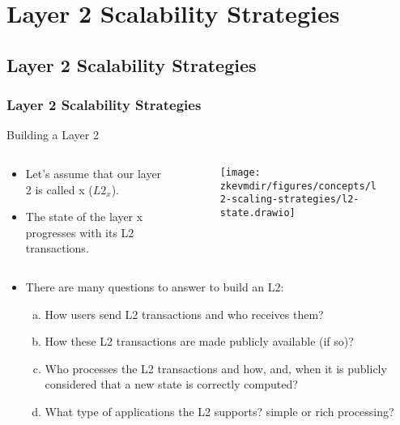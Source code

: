 

\renewcommand{\mytitle}{Layer 2 Scalability Strategies}
\ifZEROSEC \fi
\ifSEC \section{\mytitle{}}\fi
\ifSUBSEC \subsection{\mytitle{}}\fi
\ifSUBSUBSEC \subsubsection{\mytitle{}}\fi


\begin{frame}{Building a Layer 2}
\begin{columns}
\begin{column}{0.35\textwidth}
\begin{itemize}
\item Let's assume that our layer 2 is called x ($L2_x$).
\item The state of the layer x progresses with its L2 transactions.
\end{itemize}
\end{column}
\begin{column}{0.65\textwidth}
\begin{figure}
\texttt{[image: \\zkevmdir/figures/concepts/l2-scaling-strategies/l2-state.drawio]}
\end{figure}
\end{column}
\end{columns}

\begin{itemize}
\item There are many questions to answer to build an L2:
  \begin{enumerate}[a)]
  \item How users send L2 transactions and who receives them?
  \item How these L2 transactions are made publicly available (if so)?
  \item Who processes the L2 transactions and how, and, when 
  it is publicly considered that a new state is correctly computed?
  \item What type of applications the L2 supports? simple or rich processing?
  \end{enumerate}
\end{itemize}
\end{frame}




